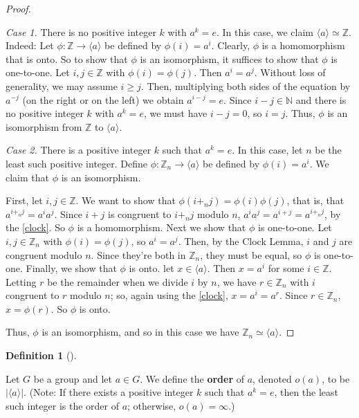 \documentclass[10pt,]{book}
\newcommand{\terminology}[1]{\textbf{#1}}
\theoremstyle{plain}
\theoremstyle{definition}
\newtheorem{definition}[theorem]{Definition}
\theoremstyle{definition}
\theoremstyle{definition}
\theoremstyle{definition}
\numberwithin{equation}{section}
\def\Z{\mathbb{Z}}
\def\N{\mathbb{N}}
\begin{document}
\begin{proof}\hypertarget{proof-23}{}

    \emph{Case 1.} There is no positive integer \(k\) with \(a^k=e\). In this case, we claim \(\langle a\rangle \simeq \Z\). Indeed: Let \(\phi:\Z\to \langle a\rangle\) be defined by \(\phi(i)=a^i\). Clearly, \(\phi\) is a homomorphism that is onto. So to show that \(\phi\) is an isomorphism, it suffices to show that \(\phi\) is one-to-one. Let \(i,j\in \Z\) with \(\phi(i)=\phi(j)\). Then \(a^i=a^j\). Without loss of generality, we may assume \(i\geq j\). Then, multiplying both sides of the equation by \(a^{-j}\) (on the right or on the left) we obtain \(a^{i-j}=e\). Since \(i-j\in \N\) and there is no positive integer \(k\) with \(a^k=e\), we must have \(i-j=0\), so \(i=j\). Thus, \(\phi\) is an isomorphism from \(\Z\) to \(\langle a\rangle\).
\par

    \emph{Case 2.}  There is a positive integer \(k\) such that \(a^k=e\). In this case, let \(n\) be the least such positive integer. Define \(\phi:\Z_n\to \langle a\rangle\) be defined by \(\phi(i)=a^i\). We claim that \(\phi\) is an isomorphism.
\par
 First, let \(i,j\in \Z\). We want to show that \(\phi(i+_nj)=\phi(i)\phi(j)\), that is, that \(a^{i+_nj}=a^ia^j\). Since \(i+j\) is congruent to \(i+_nj\) modulo \(n\), \(a^ia^j=a^{i+j}=a^{i+_nj}\), by the \hyperref[clock]{\ref{clock}}. So \(\phi\) is a homomorphism. Next we show that \(\phi\) is one-to-one. Let \(i,j\in \Z_n\) with \(\phi(i)=\phi(j)\), so \(a^i=a^j\). Then, by the Clock Lemma, \(i\) and \(j\) are congruent modulo \(n\). Since they're both in \(\Z_n\), they must be equal,
    so \(\phi\) is one-to-one. Finally, we show that \(\phi\) is onto. let \(x\in \langle a\rangle\). Then \(x=a^i\) for some \(i\in \Z\). Letting \(r\) be the remainder when we divide \(i\) by \(n\), we have \(r\in \Z_n\) with \(i\) congruent to \(r\) modulo \(n\); so, again using the \hyperref[clock]{\ref{clock}}, \(x=a^i=a^r\). Since \(r\in \Z_n\), \(x=\phi(r)\). So \(\phi\) is onto.%
\par
Thus, \(\phi\) is an isomorphism, and so in this case we have \(\Z_n \simeq \langle a \rangle\).
\end{proof}
\begin{definition}[{}]\label{definition-38}

        Let \(G\) be a group and let \(a\in G\). We define the \terminology{order} of \(a\), denoted \(o(a)\), to be \(|\langle a\rangle |\). (Note: If there exists a positive integer \(k\) such that \(a^k=e\), then the least such integer is the order of \(a\); otherwise, \(o(a)=\infty\).)
\label{notation-54}
\end{definition}
\end{document}
